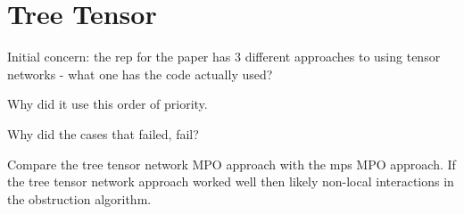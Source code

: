 \section{Tree Tensor}

Initial concern: the rep for the paper has 3 different approaches to using tensor networks - what one has the code actually used?

Why did it use this order of priority.

Why did the cases that failed, fail?

Compare the tree tensor network MPO approach with the mps MPO approach. If the tree tensor network approach worked well then likely non-local interactions in the obstruction algorithm.
